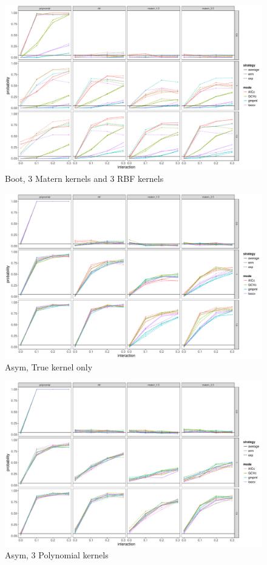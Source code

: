 \documentclass[11pt]{article}
\begin{document}
\begin{figure}
\begin{center}
\includegraphics[width=0.9\columnwidth]{B5} 
\caption{Boot, 3 Matern kernels and 3 RBF kernels}
\label{fig:res}
\end{center}
\end{figure}

\begin{figure}
\begin{center}
\includegraphics[width=0.9\columnwidth]{A1} 
\caption{Asym, True kernel only}
\label{fig:res}
\end{center}
\end{figure}

\begin{figure}
\begin{center}
\includegraphics[width=0.9\columnwidth]{A2} 
\caption{Asym, 3 Polynomial kernels}
\label{fig:res}
\end{center}
\end{figure}
\end{document}
